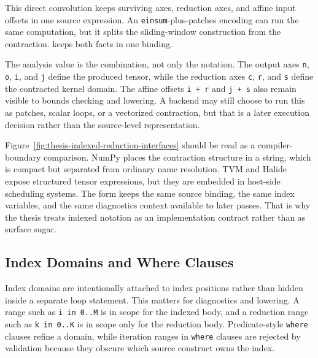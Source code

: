 This direct convolution keeps surviving axes, reduction axes, and affine input
offsets in one source expression. An \texttt{einsum}-plus-patches encoding can
run the same computation, but it splits the sliding-window construction from the
contraction. \einlang{} keeps both facts in one binding.

The analysis value is the combination, not only the notation. The output axes
\texttt{n}, \texttt{o}, \texttt{i}, and \texttt{j} define the produced tensor,
while the reduction axes \texttt{c}, \texttt{r}, and \texttt{s} define the
contracted kernel domain. The affine offsets \texttt{i + r} and \texttt{j + s}
also remain visible to bounds checking and lowering. A backend may still choose
to run this as patches, scalar loops, or a vectorized contraction, but that is a
later execution decision rather than the source-level representation.

\begin{center}
\centering

\captionsetup{type=figure,hypcap=false}
\caption{Thesis-adapted comparison of indexed reduction interfaces. The reused
paper example is copied into the thesis figure set and retuned around compiler
facts rather than presentation brevity.}
\label{fig:thesis-indexed-reduction-interfaces}
\end{center}

Figure~\ref{fig:thesis-indexed-reduction-interfaces} should be read as a
compiler-boundary comparison. NumPy places the contraction structure in a
string, which is compact but separated from ordinary name resolution. TVM and
Halide expose structured tensor expressions, but they are embedded in host-side
scheduling systems. The \einlang{} form keeps the same source binding, the same
index variables, and the same diagnostics context available to later passes.
That is why the thesis treats indexed notation as an implementation contract
rather than as surface sugar.

\subsection{Index Domains and Where Clauses}

Index domains are intentionally attached to index positions rather than hidden
inside a separate loop statement. This matters for diagnostics and lowering. A
range such as \texttt{i in 0..M} is in scope for the indexed body, and a
reduction range such as \texttt{k in 0..K} is in scope only for the reduction
body. Predicate-style \texttt{where} clauses refine a domain, while iteration
ranges in \texttt{where} clauses are rejected by validation because they obscure
which source construct owns the index.

